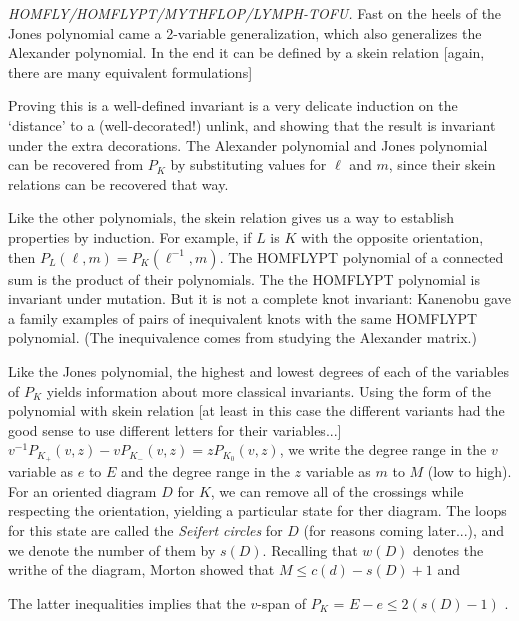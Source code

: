 \msk


{\it HOMFLY/HOMFLYPT/MYTHFLOP/LYMPH-TOFU.} Fast on the heels of the Jones polynomial
came a 2-variable generalization, which also generalizes the Alexander polynomial.
In the end it can be defined by a skein relation [again, there are many 
equivalent formulations] 


Proving this is a well-defined invariant is a very delicate induction on 
the `distance' to a (well-decorated!) unlink, and showing that the result is
invariant under the extra decorations. The Alexander polynomial and Jones
polynomial can be recovered from $P_K$ by substituting values for $\ell$ and
$m$, since their skein relations can be recovered that way.

\ssk

Like the other polynomials, the skein relation gives us a way to establish properties
by induction. For example, if $L$ is $K$ with the opposite orientation, then 
$P_L(\ell,m)=P_K(\ell^{-1},m)$. The HOMFLYPT polynomial of a connected sum is 
the product of their polynomials. The the HOMFLYPT polynomial is 
invariant under mutation. But it is not a complete knot invariant: Kanenobu
gave a family examples of pairs of inequivalent knots with the same 
HOMFLYPT polynomial. (The inequivalence comes from studying the Alexander matrix.)

\ssk

Like the Jones polynomial, the highest and lowest degrees of each of the variables
of $P_K$ yields information about more classical invariants. Using the form 
of the polynomial with skein relation [at least in this case the different
variants had the good sense to use different letters for their variables...]
$v^{-1} P_{K_+}(v,z)-vP_{K_-}(v,z)=zP_{K_0}(v,z)$, we write the
degree range in the $v$ variable as $e$ to $E$ and the degree range in the $z$
variable as $m$ to $M$ (low to high). For an oriented diagram $D$ for $K$, we
can remove all of the crossings while respecting the orientation, yielding a 
particular state for ther diagram. The loops for this state are called the
{\it Seifert circles} for $D$ (for reasons coming later...), and we denote the
number of them by $s(D)$. Recalling that $w(D)$ denotes the writhe of the
diagram, Morton showed that $M\leq c(d)-s(D)+1$ and 


The latter inequalities implies that 
the $v$-span of $P_K$ = $E-e\leq 2(s(D)-1)$ .

